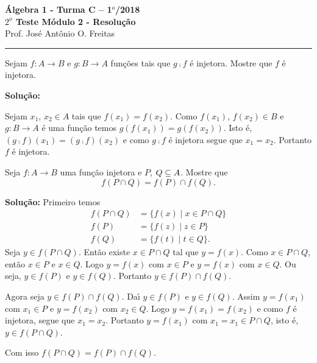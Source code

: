 \documentclass[12pt]{article}
\begin{document}


\begin{center}
{\Large\bf {\'A}lgebra 1 - Turma C -- 1$^{o}$/2018} \\ \vspace{9pt} {\large\bf
  $2^{\underline{o}}$ Teste M\'odulo 2 - Resolu\c{c}\~ao}\\
\vspace{9pt} Prof. Jos{\'e} Ant{\^o}nio O. Freitas
\end{center}
\hrule

\vspace{.6cm}

\questao Sejam $f : A \to B$ e $g : B \to A$ fun\c{c}\~oes tais que $g \comp f$ \'e injetora. Mostre que $f$ \'e injetora.

\noindent\textbf{Solu\c{c}\~ao:}

	Sejam $x_1$, $x_2 \in A$ tais que $f(x_1) = f(x_2)$. Como $f(x_1)$, $f(x_2) \in B$ e $g : B \to A$ \'e uma fun\c{c}\~ao temos $g(f(x_1)) = g(f(x_2))$. Isto \'e, $(g \comp f)(x_1) = (g \comp f)(x_2)$ e como $g \comp f$ \'e injetora segue que $x_1 = x_2$. Portanto $f$ \'e injetora.

\vspace{.5cm}

\questao Seja $f : A \to B$ uma fun\c{c}\~ao injetora e $P$, $Q \subseteq A$. Mostre que
\[
	f(P \cap Q) = f(P) \cap f(Q).
\]

\noindent\textbf{Solu\c{c}\~ao:} Primeiro temos
\begin{align*}
	f(P \cap Q) &= \{f(x) \mid x \in P \cap Q\}\\
	f(P) &= \{f(z) \mid z \in P\}\\
	f(Q) &= \{f(t) \mid t \in Q\}.
\end{align*}
Seja $y \in f(P \cap Q)$. Ent\~ao existe $x \in P \cap Q$ tal que $y = f(x)$. Como $x \in P \cap Q$, ent\~ao $x \in P$ e $x \in Q$. Logo $y = f(x)$ com $x \in P$ e $y = f(x)$ com $x \in Q$. Ou seja, $y \in f(P)$ e $y \in f(Q)$. Portanto $y \in f(P) \cap f(Q)$.

Agora seja $y \in f(P) \cap f(Q)$. Da{\'\i} $y \in f(P)$ e $y \in f(Q)$. Assim $y = f(x_1)$ com $x_1 \in P$ e $y = f(x_2)$ com $x_2 \in Q$. Logo $y = f(x_1) = f(x_2)$ e como $f$ \'e injetora, segue que $x_1 = x_2$. Portanto $y = f(x_1)$ com $x_1 = x_1 \in P \cap Q$, isto \'e, $y \in f(P \cap Q)$.

Com isso $f(P \cap Q) = f(P) \cap f(Q)$.
\end{document}
